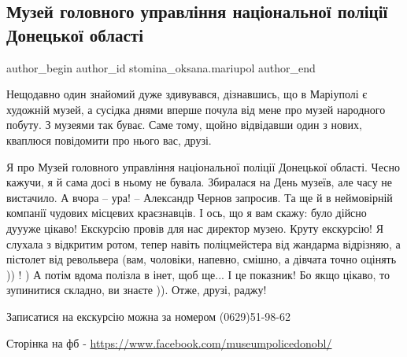  
 
 
 
 

\subsection{Музей головного управління національної поліції Донецької області}
\label{sec:13_10_2021.fb.stomina_oksana.mariupol.1.muzei_golovnogo_upra}

\ifcmt
 author_begin
   author_id stomina_oksana.mariupol
 author_end
\fi

Нещодавно один знайомий дуже здивувався, дізнавшись, що в Маріуполі є художній
музей, а сусідка днями вперше почула від мене про музей народного побуту.  З
музеями так буває. Саме тому, щойно відвідавши один з нових, кваплюся
повідомити про нього вас, друзі. 

Я про Музей головного управління національної поліції Донецької області. Чесно
кажучи, я й сама досі в ньому не бувала. Збиралася на День музеїв, але часу не
вистачило. А вчора – ура! – Александр Чернов запросив. Та ще й в неймовірній
компанії чудових місцевих краєзнавців. І ось, що я вам скажу: було дійсно
дуууже цікаво! Екскурсію провів для нас директор музею. Круту екскурсію! Я
слухала з відкритим ротом, тепер навіть поліцмейстера від жандарма відрізняю, а
пістолет від револьвера (вам, чоловіки, напевно, смішно, а дівчата точно
оцінять )) ! ) А потім вдома полізла в інет, щоб ще... І це показник! Бо якщо
цікаво, то зупинитися складно, ви знаєте )). Отже, друзі, раджу! 

Записатися на екскурсію можна за номером (0629)51-98-62

Сторінка на фб - \url{https://www.facebook.com/museumpolicedonobl/}

